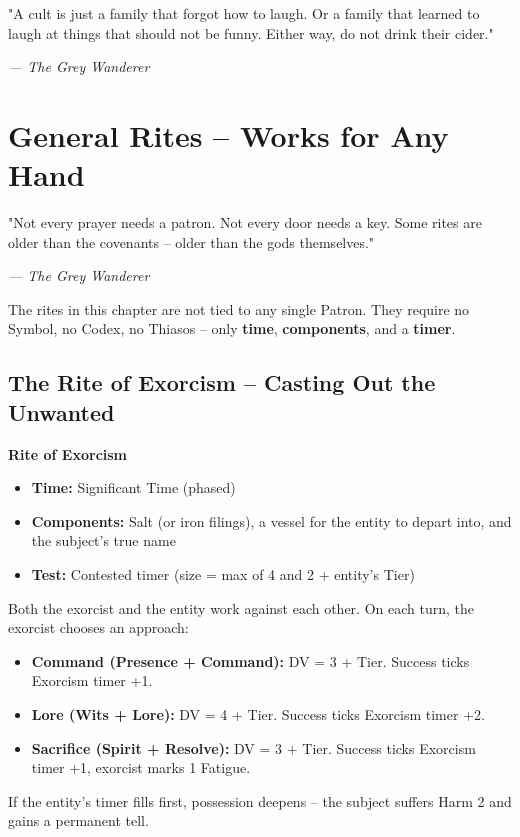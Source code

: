 \documentclass[10pt,a5paper]{book}
\begin{document}
\epigraph{"A cult is just a family that forgot how to laugh. Or a family that learned to laugh at things that should not be funny. Either way, do not drink their cider."}{\textit{--- The Grey Wanderer}}

\clearpage


\chapter{General Rites -- Works for Any Hand}

\epigraph{"Not every prayer needs a patron. Not every door needs a key. Some rites are older than the covenants -- older than the gods themselves."}{\textit{--- The Grey Wanderer}}

The rites in this chapter are not tied to any single Patron. They require no Symbol, no Codex, no Thiasos -- only \textbf{time}, \textbf{components}, and a \textbf{timer}.

\section{The Rite of Exorcism -- Casting Out the Unwanted}

\begin{tcolorbox}[colback=blue!5, colframe=blue!70]
\textbf{Rite of Exorcism}
\begin{itemize}
    \item \textbf{Time:} Significant Time (phased)
    \item \textbf{Components:} Salt (or iron filings), a vessel for the entity to depart into, and the subject's true name
    \item \textbf{Test:} Contested timer (size = max of 4 and 2 + entity's Tier)
\end{itemize}
\end{tcolorbox}

Both the exorcist and the entity work against each other. On each turn, the exorcist chooses an approach:
\begin{itemize}
    \item \textbf{Command (Presence + Command):} DV = 3 + Tier. Success ticks Exorcism timer +1.
    \item \textbf{Lore (Wits + Lore):} DV = 4 + Tier. Success ticks Exorcism timer +2.
    \item \textbf{Sacrifice (Spirit + Resolve):} DV = 3 + Tier. Success ticks Exorcism timer +1, exorcist marks 1 Fatigue.
\end{itemize}
If the entity's timer fills first, possession deepens -- the subject suffers Harm 2 and gains a permanent tell.
\end{document}
